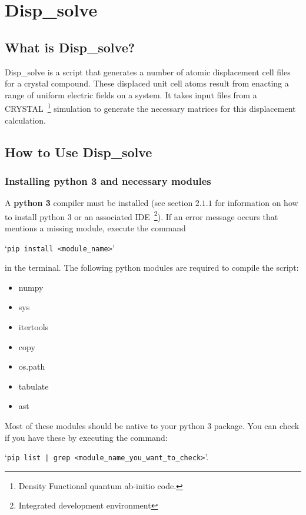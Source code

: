 \section{Disp\_solve}
\subsection{What is Disp\_solve?}
Disp\_solve is a script that generates a number of atomic displacement cell
files for a crystal compound. These displaced unit cell atoms result from
enacting a range of uniform electric fields on a system. It takes input files
from a CRYSTAL~\footnote{Density Functional quantum ab-initio code.}
simulation to generate the necessary matrices for this displacement
calculation.

\subsection{How to Use Disp\_solve}
\subsubsection{Installing python 3 and necessary modules}
A \textbf{python 3} compiler must be installed (see section $2.1.1$ for
information on how to install python 3 or an associated IDE~\footnote{Integrated development environment}). If an error message occurs that
mentions a missing module, execute the command

`\texttt{pip install <module\_name>}'

in the terminal. The following python modules are required to compile
the script:
  \begin{itemize} \itemsep -0.5ex
 	\item numpy
 	\item sys
 	\item itertools
 	\item copy
 	\item os.path
 	\item tabulate
 	\item ast
 \end{itemize}

Most of these modules should be native to your python 3 package. You can check if you have these by executing the command:

`\texttt{pip list | grep <module\_name\_you\_want\_to\_check>}'.

